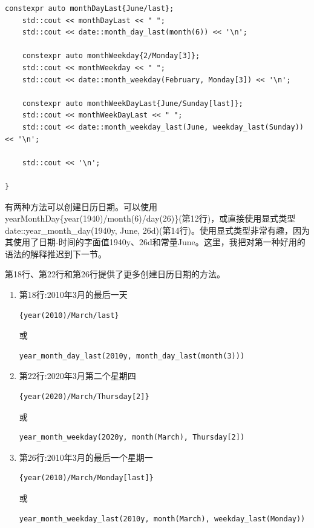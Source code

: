 \begin{lstlisting}[style=styleCXX]
	constexpr auto monthDayLast{June/last};
	std::cout << monthDayLast << " ";
	std::cout << date::month_day_last(month(6)) << '\n';
	
	constexpr auto monthWeekday{2/Monday[3]};
	std::cout << monthWeekday << " ";
	std::cout << date::month_weekday(February, Monday[3]) << '\n';
	
	constexpr auto monthWeekDayLast{June/Sunday[last]};
	std::cout << monthWeekDayLast << " ";
	std::cout << date::month_weekday_last(June, weekday_last(Sunday)) << '\n';
	
	std::cout << '\n';

}
\end{lstlisting}

有两种方法可以创建日历日期。可以使用yearMonthDay\{year(1940)/month(6)/day(26)\}(第12行)，或直接使用显式类型date::year\_month\_day(1940y, June, 26d)(第14行)。使用显式类型非常有趣，因为其使用了日期-时间的字面值1940y、26d和常量June。这里，我把对第一种好用的语法的解释推迟到下一节。

第18行、第22行和第26行提供了更多创建日历日期的方法。

\begin{enumerate}
\item 
第18行:2010年3月的最后一天
\begin{lstlisting}[style=styleCXX]
{year(2010)/March/last}
\end{lstlisting}
或
\begin{lstlisting}[style=styleCXX]
year_month_day_last(2010y, month_day_last(month(3)))
\end{lstlisting}

\item 
第22行:2020年3月第二个星期四
\begin{lstlisting}[style=styleCXX]
{year(2020)/March/Thursday[2]}
\end{lstlisting}
或
\begin{lstlisting}[style=styleCXX]
year_month_weekday(2020y, month(March), Thursday[2])
\end{lstlisting}

\item 
第26行:2010年3月的最后一个星期一
\begin{lstlisting}[style=styleCXX]
{year(2010)/March/Monday[last]}
\end{lstlisting}
或
\begin{lstlisting}[style=styleCXX]
year_month_weekday_last(2010y, month(March), weekday_last(Monday))
\end{lstlisting}
\end{enumerate}

